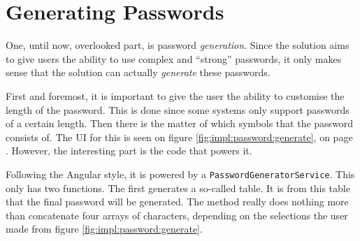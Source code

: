 




	\section{Generating Passwords}
		One, until now, overlooked part, is password \emph{generation}. Since the solution aims to give users the ability to use complex and ``strong'' passwords, it only makes sense that the solution can actually \emph{generate} these passwords.

		First and foremost, it is important to give the user the ability to customise the length of the password. This is done since some systems only support passwords of a certain length. Then there is the matter of which symbols that the password consists of. The UI for this is seen on figure \ref{fig:impl:password:generate}, on page \pageref{fig:impl:password:generate}. However, the interesting part is the code that powers it.

		Following the Angular style, it is powered by a \verb=PasswordGeneratorService=. This only has two functions. The first generates a so-called table. It is from this table that the final password will be generated. The method really does nothing more than concatenate four arrays of characters, depending on the selections the user made from figure \ref{fig:impl:password:generate}.


